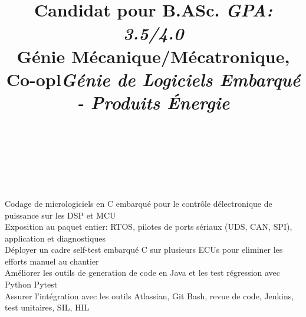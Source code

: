\documentclass[mm]{res}
\begin{document}
\begin{resume}
\title{Candidat pour B.ASc. \textsl{GPA: 3.5/4.0}\\
G\'enie M\'ecanique/M\'ecatronique, Co-op}
\begin{position}
\end{position}


\toprule

\section{\headingexperience}
\begin{format}
\\
\title{l}\\
\body\\
\end{format}

\title{\textsl{G\'enie de Logiciels Embarqu\'e - Produits \'Energie}}
\begin{position}
\tb Codage de micrologiciels en C embarqu\'e pour le contr\^ole d\textquotesingle \'electronique de puissance sur les DSP et MCU\\
\tb Exposition au paquet entier: RTOS, pilotes de ports s\'eriaux (UDS, CAN, SPI), application et diagnostiques\\
\tb D\'eployer un cadre self-test embarqu\'e C sur plusieurs ECUs pour eliminer les efforts manuel au chantier\\
\tb Am\'eliorer les outils de generation de code en Java et les test r\'egression avec Python Pytest\\
\tb Assurer l'int\'egration avec les outils Atlassian, Git Bash, revue de code, Jenkins, test unitaires, SIL, HIL
\end{position}


\end{resume}
\end{document}
